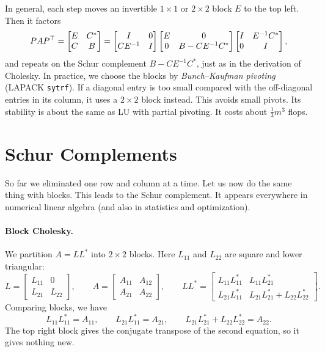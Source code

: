 In general, each step moves an invertible $1 \times 1$ or $2 \times 2$ block $E$ to the top left. Then it factors
\begin{equation}
  PAP^\top = \begin{bmatrix} E & C^\ast \\ C & B \end{bmatrix} = \begin{bmatrix} I & 0 \\ CE^{-1} & I \end{bmatrix}\begin{bmatrix} E & 0 \\ 0 & B - CE^{-1}C^\ast \end{bmatrix}\begin{bmatrix} I & E^{-1}C^\ast \\ 0 & I \end{bmatrix},
\end{equation}
and repeats on the Schur complement $B - CE^{-1}C^\ast$, just as in the derivation of Cholesky. In practice, we choose the blocks by \emph{Bunch--Kaufman pivoting} (LAPACK \texttt{sytrf}). If a diagonal entry is too small compared with the off-diagonal entries in its column, it uses a $2 \times 2$ block instead. This avoids small pivots. Its stability is about the same as LU with partial pivoting. It costs about $\frac{1}{3}m^3$ flops.

\section{Schur Complements}
\label{sec:schur}

So far we eliminated one row and column at a time. Let us now do the same thing with blocks. This leads to the Schur complement. It appears everywhere in numerical linear algebra (and also in statistics and optimization).

\paragraph{Block Cholesky.} We partition $A = LL^\ast$ into $2 \times 2$ blocks. Here $L_{11}$ and $L_{22}$ are square and lower triangular:
\begin{equation}
  L = \begin{bmatrix} L_{11} & 0 \\ L_{21} & L_{22} \end{bmatrix}, \qquad
  A = \begin{bmatrix} A_{11} & A_{12} \\ A_{21} & A_{22} \end{bmatrix}, \qquad
  LL^\ast = \begin{bmatrix} L_{11}L_{11}^\ast & L_{11}L_{21}^\ast \\ L_{21}L_{11}^\ast & L_{21}L_{21}^\ast + L_{22}L_{22}^\ast \end{bmatrix}.
\end{equation}
Comparing blocks, we have
\begin{equation}
  L_{11}L_{11}^\ast = A_{11}, \qquad L_{21}L_{11}^\ast = A_{21}, \qquad L_{21}L_{21}^\ast + L_{22}L_{22}^\ast = A_{22}.
\end{equation}
The top right block gives the conjugate transpose of the second equation, so it gives nothing new.

